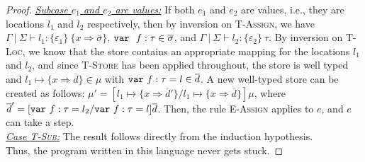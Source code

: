 \begin{proof}
\underline{\textit{Subcase $e_1$ and $e_2$ are values:}} If both $e_1$ and $e_2$ are values, i.e., they are locations $l_1$ and $l_2$ respectively, then by inversion on \textsc{T-Assign}, we have $\Gamma~|~\Sigma \vdash l_1 : \{ \varepsilon_1 \}~\{ x \Rightarrow \overline{\sigma} \}$, $\mathtt{var}~~ f : \tau \in \overline{\sigma}$, and $\Gamma~|~\Sigma \vdash l_2 : \{ \varepsilon_2 \}~\tau$. By inversion on \textsc{T-Loc}, we know that the store contains an appropriate mapping for the locations $l_1$ and $l_2$, and since \textsc{T-Store} has been applied throughout, the store is well typed and $l_1 \mapsto \{ x \Rightarrow \overline{d} \} \in \mu$ with $\mathtt{var}~ f : \tau = l \in \overline{d}$. A new well-typed store can be created as follows: $\mu' = [l_1 \mapsto \{ x \Rightarrow \overline{d}' \}/l_1 \mapsto \{ x \Rightarrow \overline{d} \}]\mu$, where $\overline{d}' = [\mathtt{var}~ f : \tau = l_2/\mathtt{var}~ f : \tau = l]\overline{d}$. Then, the rule \textsc{E-Assign} applies to $e$, and $e$ can take a step.
\\

\noindent\underline{\textit{Case \textsc{T-Sub}:}}
The result follows directly from the induction hypothesis.
\\

\noindent Thus, the program written in this language never gets stuck.
\end{proof}



